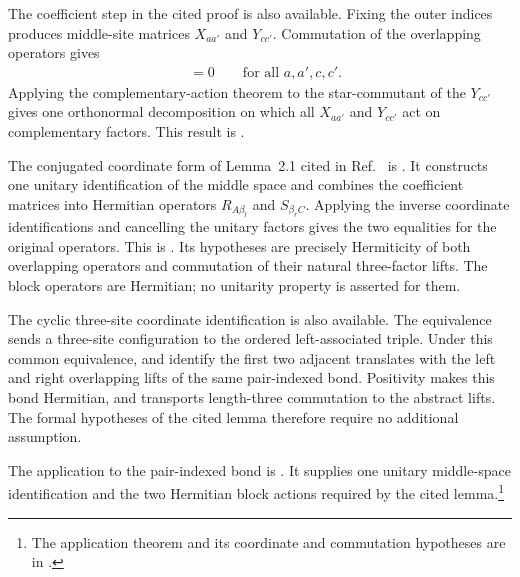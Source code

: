 \documentclass{article}
\begin{document}
The coefficient step in the cited proof is also available. Fixing the outer
indices produces middle-site matrices $X_{aa'}$ and $Y_{cc'}$. Commutation of
the overlapping operators gives
\begin{align}
    [X_{aa'},Y_{cc'}]
        &=0
        \qquad\text{for all }a,a',c,c'.
    \label{eq:cpsv16_commuting_form_to_sal_middle_coefficient_commutation}
\end{align}
Applying the complementary-action theorem to the star-commutant of the
$Y_{cc'}$ gives one orthonormal decomposition on which all $X_{aa'}$ and
$Y_{cc'}$ act on complementary factors. This result is
.

The conjugated coordinate form of Lemma~2.1 cited in
Ref.~\cite{Cirac2016MPDO_arXiv} is
.
It constructs one unitary identification of the middle space and combines the
coefficient matrices into Hermitian operators $R_{A\beta_l}$ and
$S_{\beta_rC}$. Applying the inverse coordinate identifications and cancelling
the unitary factors gives the two equalities for the original operators. This
is
.
Its hypotheses are precisely Hermiticity of both overlapping operators and
commutation of their natural three-factor lifts. The block operators are
Hermitian; no unitarity property is asserted for them.

The cyclic three-site coordinate identification is also available. The
equivalence  sends a three-site
configuration to the ordered left-associated triple. Under this common
equivalence,
and
identify the first two adjacent translates with the left and right overlapping
lifts of the same pair-indexed bond. Positivity makes this bond Hermitian, and
transports length-three commutation to the abstract lifts. The formal
hypotheses of the cited lemma therefore require no additional assumption.

The application to the pair-indexed bond is
.
It supplies one unitary middle-space identification and the two Hermitian
block actions required by the cited lemma.\footnote{The application theorem and
its coordinate and commutation hypotheses are in
.}
\end{document}
